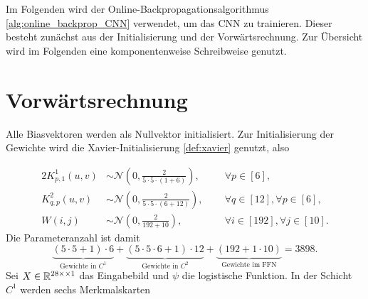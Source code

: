 Im Folgenden wird der Online-Backpropagationsalgorithmus \ref{alg:online_backprop_CNN} verwendet, um das CNN zu trainieren. Dieser besteht zunächst aus der Initialisierung und der Vorwärtsrechnung. Zur Übersicht wird im Folgenden eine komponentenweise Schreibweise genutzt.

\section*{Vorwärtsrechnung}

Alle Biasvektoren werden als Nullvektor initialisiert. Zur Initialisierung der Gewichte wird die Xavier-Initialisierung \ref{def:xavier} genutzt, also

\begin{alignat*}{2}
    K^{1}_{p,1}(u,v) &\sim  \mathcal{N} \left(0, \frac{2}{5 \cdot 5 \cdot (1+6)}\right), \; \; && \forall p \in [6],\\
    K^{2}_{q,p}(u,v) &\sim  \mathcal{N} \left(0, \frac{2}{5 \cdot 5 \cdot (6+12)}\right),\; \; && \forall q \in [12], \forall p \in [6],\\
    W(i,j) &\sim \mathcal{N} \left(0, \frac{2}{192+10}\right), \; \; &&\forall i \in [192], \forall j \in [10].
\end{alignat*}
Die Parameteranzahl ist damit 
\begin{equation*}
    \underbrace{(5 \cdot 5 +1) \cdot 6}_{\text{Gewichte in $C^1$}}+\underbrace{(5 \cdot 5 \cdot 6+1) \cdot 12}_{\text{Gewichte in $C^2$}}+\underbrace{(192+1 \cdot 10)}_{\text{Gewichte im FFN}}=3898.
\end{equation*}
 Sei $X \in \mathbb{R}^{28 \times \times 1}$ das Eingabebild und $\psi$ die logistische Funktion. In der Schicht $C^1$ werden sechs Merkmalskarten 

